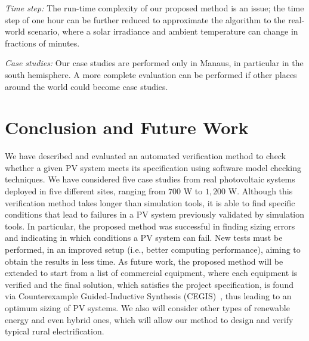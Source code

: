\documentclass[journal]{IEEEtran}
\begin{document}
\textit{Time step:} The run-time complexity of our proposed method is an issue; the time step of one hour can be further reduced to approximate the algorithm to the real-world scenario, where a solar irradiance and ambient temperature can change in fractions of minutes.

\textit{Case studies:} Our case studies are performed only in Manaus, in particular in the south hemisphere. A more complete evaluation can be performed if other places around the world could become case studies.

\section{Conclusion and Future Work}
\label{sec:Conclusions}
We have described and evaluated an automated verification method to check whether a given PV system meets its specification using software model checking techniques. We have considered five case studies from real photovoltaic systems deployed in five different sites, ranging from $700$ W to $1,200$ W. Although this verification method takes longer than simulation tools, it is able to find specific conditions that lead to failures in a PV system previously validated by simulation tools. In particular, the proposed method was successful in finding sizing errors and indicating in which conditions a PV system can fail. New tests must be performed, in an improved setup (i.e., better computing performance), aiming to obtain the results in less time. As future work, the proposed method will be extended to start from a list of commercial equipment, where each equipment is verified and the final solution, which satisfies the project specification, is found via Counterexample Guided-Inductive Synthesis (CEGIS)~\cite{DBLP:conf/asplos/Solar-LezamaTBSS06}, thus leading to an optimum sizing of PV systems. We also will consider other types of renewable energy and even hybrid ones, which will allow our method to design and verify typical rural electrification.
%
\end{document}
